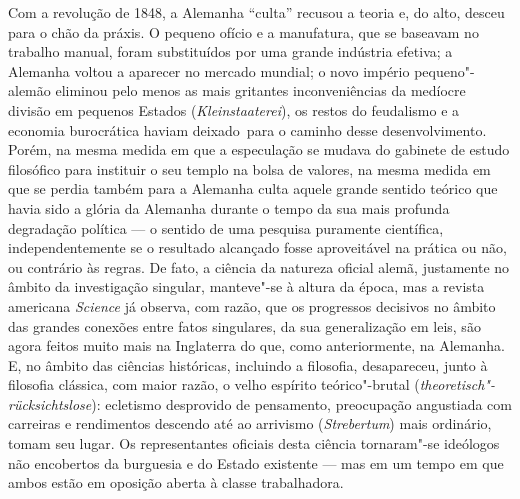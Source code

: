 Com a revolução de 1848, a Alemanha ``culta'' recusou a teoria e, do
alto, desceu para o chão da práxis. O pequeno ofício e a manufatura, que
se baseavam no trabalho manual, foram substituídos por uma grande
indústria efetiva; a Alemanha voltou a aparecer no mercado mundial; o
novo império pequeno"-alemão eliminou pelo
menos as mais gritantes inconveniências da medíocre divisão em pequenos
Estados (\emph{Kleinstaaterei}), os restos
do feudalismo e a economia burocrática haviam deixado\est\ para o caminho
desse desenvolvimento. Porém, na mesma medida em que a especulação se
mudava do gabinete de estudo filosófico para instituir o seu templo na
bolsa de valores, na mesma medida em que se perdia também para a
Alemanha culta aquele grande sentido teórico que havia sido a glória da
Alemanha durante o tempo da sua mais profunda degradação política --- o
sentido de uma pesquisa puramente científica, independentemente se o
resultado alcançado fosse aproveitável na prática ou não, ou contrário
às regras. De fato, a ciência da natureza oficial alemã, justamente no
âmbito da investigação singular, manteve"-se à altura da época, mas a
revista americana \emph{Science } já observa, com razão, que os
progressos decisivos no âmbito das grandes conexões entre fatos
singulares, da sua generalização em leis, são agora feitos muito mais na
Inglaterra do que, como anteriormente, na Alemanha. E, no âmbito das
ciências históricas, incluindo a filosofia, desapareceu, junto à
filosofia clássica, com maior razão, o velho espírito teórico"-brutal
(\emph{theoretisch"-rücksichtslose}): ecletismo desprovido
de pensamento, preocupação angustiada com carreiras e rendimentos
descendo até ao arrivismo (\emph{Strebertum}) mais ordinário, tomam seu
lugar. Os representantes oficiais desta ciência tornaram"-se ideólogos
não encobertos da burguesia e do Estado existente --- mas em um tempo em
que ambos estão em oposição aberta à classe trabalhadora.

